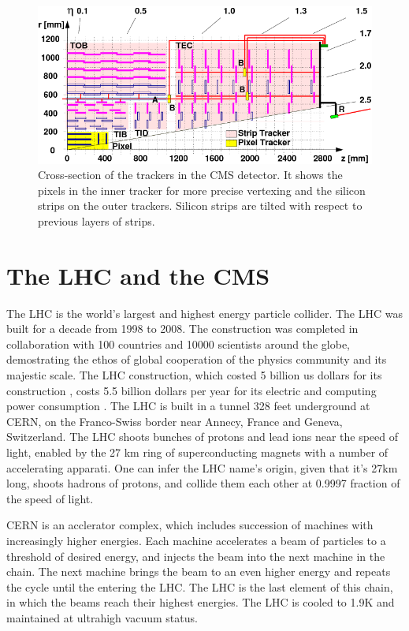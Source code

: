 \begin{figure}[h!]
	\caption{Cross-section of the trackers in the CMS detector. It shows the pixels in the inner tracker for more precise vertexing and the silicon strips on the outer trackers. Silicon strips are tilted with respect to previous layers of strips. \cite{trk}}
  \label{fig:tracker}
  \centering
  \includegraphics[width=0.9\linewidth]{figs/Tracker.png}
\end{figure}
\section{The LHC and the CMS}
The LHC is the world's largest and highest energy particle collider.
The LHC was built for a decade from 1998 to 2008. 
The construction was completed in collaboration with 100 countries and 10000 scientists around the globe, demostrating the ethos of global cooperation of the physics community and its majestic scale. 
The LHC construction, which costed 5 billion us dollars for its construction , costs 5.5 billion dollars per year for its electric and computing power consumption \cite{LHCweb}.
The LHC is built in a tunnel 328 feet underground at CERN, on the Franco-Swiss border near Annecy, France and  Geneva, Switzerland.
The LHC shoots bunches of protons and lead ions near the speed of light, enabled by the 27 km ring of superconducting magnets with a number of accelerating apparati.
One can infer the LHC name's origin, given that it's 27km long, shoots hadrons of protons, and collide them each other at 0.9997 fraction of the speed of light.

CERN is an acclerator complex, which includes succession of machines with increasingly higher energies. 
Each machine accelerates a beam of particles to a threshold of desired energy, and injects the beam into the next machine in the chain. 
The next machine brings the beam to an even higher energy and repeats the cycle until the entering the LHC. 
The LHC is the last element of this chain, in which the beams reach their highest energies.
The LHC is cooled to 1.9K and maintained at ultrahigh vacuum status.

